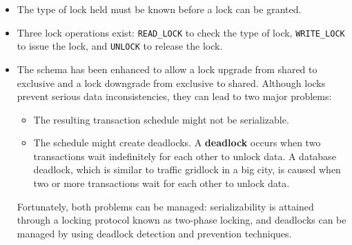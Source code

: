 \documentclass[a4paper, 11pt, titlepage]{report}
\begin{document}
\begin{itemize}
\item The type of lock held must be known before a lock can be granted.
\item Three lock operations exist: \texttt{READ\_LOCK} to check the type of lock, \texttt{WRITE\_LOCK} to issue the lock, and \texttt{UNLOCK} to release the lock.
\item The schema has been enhanced to allow a lock upgrade from shared to exclusive and a lock downgrade from exclusive to shared.
Although locks prevent serious data inconsistencies, they can lead to two major problems:
\begin{itemize}
\item The resulting transaction schedule might not be serializable.
\item The schedule might create deadlocks. A \textbf{deadlock} occurs when two transactions wait indefinitely for each other to unlock data. A database deadlock, which is similar to traffic gridlock in a big city, is caused when two or more transactions wait for each other to unlock data.
\end{itemize}
Fortunately, both problems can be managed: serializability is attained through a locking protocol known as two-phase locking, and deadlocks can be managed by using deadlock detection and prevention techniques.
\end{itemize}
\end{document}
